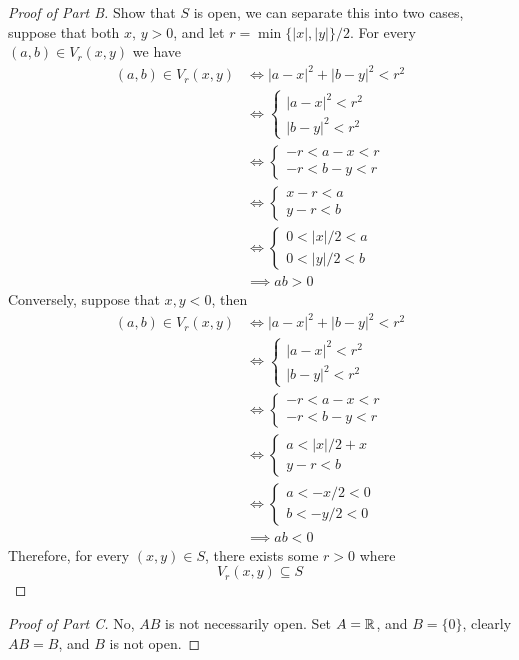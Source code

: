 \documentclass[../../main.tex]{subfiles}
\begin{document}
\begin{proof}[Proof of Part B]
    Show that $S$ is open, we can separate this into two cases, suppose that both $x,\,y>0$, and let $r = \min\{|x|,|y|\}/2$. For every $(a,b)\in V_r(x,y)$ we have
    \begin{align*}
        (a,b)\in V_r(x,y)&\iff |a-x|^2+|b-y|^2<r^2\\
        &\iff \begin{cases}|a-x|^2<r^2\\
        |b-y|^2<r^2\end{cases}\\
        &\iff \begin{cases}-r<a-x<r\\
            -r<b-y<r\end{cases}\\
        &\iff \begin{cases}x-r<a\\
            y-r<b\end{cases}\\
        &\iff \begin{cases}0<|x|/2<a\\
            0<|y|/2<b\end{cases}\\
        &\implies ab>0
    \end{align*}
    Conversely, suppose that $x,y<0$, then 
    \begin{align*}
        (a,b)\in V_r(x,y)&\iff |a-x|^2+|b-y|^2<r^2\\
        &\iff \begin{cases}|a-x|^2<r^2\\
        |b-y|^2<r^2\end{cases}\\
        &\iff \begin{cases}-r<a-x<r\\
            -r<b-y<r\end{cases}\\
        &\iff \begin{cases}a<|x|/2+x\\
            y-r<b\end{cases}\\
        &\iff \begin{cases}a<-x/2<0\\
            b<-y/2<0\end{cases}\\
        &\implies ab<0
    \end{align*}
    Therefore, for every $(x,y)\in S$, there exists some $r>0$ where
    \[V_r(x,y)\subseteq S\]
\end{proof}

\begin{proof}[Proof of Part C]
    No, $AB$ is not necessarily open. Set $A=\mathbb{R}$, and $B=\{0\}$, clearly $AB=B$, and $B$ is not open.
\end{proof}
\end{document}
